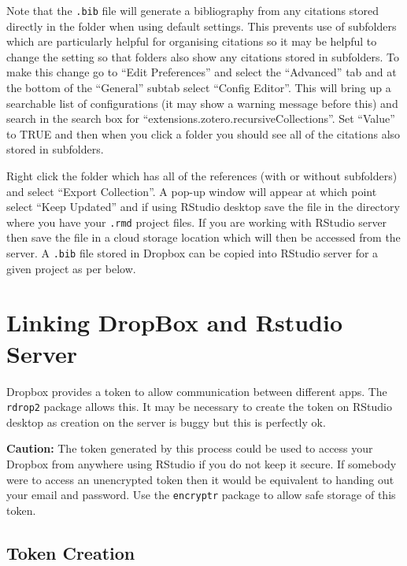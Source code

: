 \documentclass[
]{book}
\begin{document}
Note that the \texttt{.bib} file will generate a bibliography from any citations stored directly in the folder when using default settings. This prevents use of subfolders which are particularly helpful for organising citations so it may be helpful to change the setting so that folders also show any citations stored in subfolders. To make this change go to ``Edit Preferences'' and select the ``Advanced'' tab and at the bottom of the ``General'' subtab select ``Config Editor''. This will bring up a searchable list of configurations (it may show a warning message before this) and search in the search box for ``extensions.zotero.recursiveCollections''. Set ``Value'' to TRUE and then when you click a folder you should see all of the citations also stored in subfolders.

Right click the folder which has all of the references (with or without subfolders) and select ``Export Collection''. A pop-up window will appear at which point select ``Keep Updated'' and if using RStudio desktop save the file in the directory where you have your \texttt{.rmd} project files. If you are working with RStudio server then save the file in a cloud storage location which will then be accessed from the server. A \texttt{.bib} file stored in Dropbox can be copied into RStudio server for a given project as per below.

\hypertarget{linking-dropbox-and-rstudio-server}{%
\section{Linking DropBox and Rstudio Server}\label{linking-dropbox-and-rstudio-server}}

Dropbox provides a token to allow communication between different apps. The \texttt{rdrop2} package allows this. It may be necessary to create the token on RStudio desktop as creation on the server is buggy but this is perfectly ok.

\textbf{Caution:} The token generated by this process could be used to access your Dropbox from anywhere using RStudio if you do not keep it secure. If somebody were to access an unencrypted token then it would be equivalent to handing out your email and password. Use the \texttt{encryptr} package to allow safe storage of this token.

\hypertarget{token-creation}{%
\subsection{Token Creation}\label{token-creation}}
\end{document}
